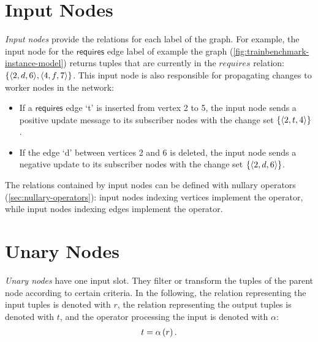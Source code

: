 \section{Input Nodes}


\emph{Input nodes} %
provide the relations for each label of the graph. For example, the input node for the $\mathsf{requires}$ edge label of example the graph (\autoref{fig:trainbenchmark-instance-model}) returns tuples that are currently in the $\mathit{requires}$ relation: $ \left\{ \langle 2, d, 6 \rangle, \langle 4, f, 7 \rangle \right\} $. This input node is also responsible for propagating changes to worker nodes in the network:

\begin{itemize}
	\item If a $\mathsf{requires}$ edge `t' is inserted from vertex 2 to 5, the input node sends a positive update message to its subscriber nodes with the change set $ \left\{ \langle 2, t, 4 \rangle \right\} $.
	\item If the edge `d' between vertices 2 and 6 is deleted, the input node sends a negative update to its subscriber nodes with the change set $ \left\{ \langle 2, d, 6 \rangle \right\} $.
\end{itemize}

The relations contained by input nodes can be defined with nullary operators (\autoref{sec:nullary-operators}): input nodes indexing vertices implement the \getverticestext operator, while input nodes indexing edges implement the \getedgestext operator.

\section{Unary Nodes}


\emph{Unary nodes} %
have one input slot. They filter or transform the tuples of the parent node according to certain criteria. In the following, the relation representing the input tuples is denoted with $r$, the relation representing the output tuples is denoted with $t$, and the operator processing the input is denoted with $\alpha$:
\begin{align*}
t = \mathrm{\alpha}\left(r\right).
\end{align*}

